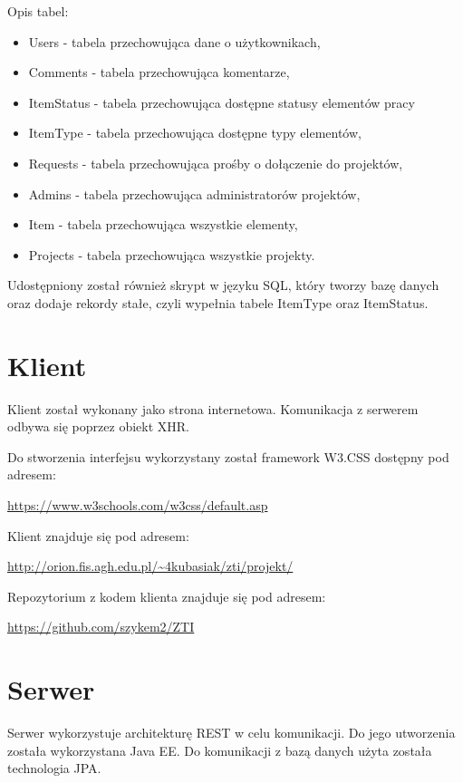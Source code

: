 \documentclass[11pt, titlepage]{article}
\begin{document}
Opis tabel:
\begin{itemize}
\item Users - tabela przechowująca dane o użytkownikach,
\item Comments - tabela przechowująca komentarze,
\item ItemStatus - tabela przechowująca dostępne statusy elementów pracy
\item ItemType - tabela przechowująca dostępne typy elementów,
\item Requests - tabela przechowująca prośby o dołączenie do projektów,
\item Admins - tabela przechowująca administratorów projektów,
\item Item - tabela przechowująca wszystkie elementy,
\item Projects - tabela przechowująca wszystkie projekty.
\end{itemize}

Udostępniony został również skrypt w języku SQL, który tworzy bazę danych oraz dodaje rekordy stałe, czyli wypełnia tabele ItemType oraz ItemStatus.

\section{Klient}
\hspace{11pt} Klient został wykonany jako strona internetowa. Komunikacja z serwerem odbywa się poprzez obiekt XHR.

Do stworzenia interfejsu wykorzystany został framework W3.CSS dostępny pod adresem:
\begin{center}
\url{https://www.w3schools.com/w3css/default.asp}
\end{center}

Klient znajduje się pod adresem:
\begin{center}
\url{http://orion.fis.agh.edu.pl/~4kubasiak/zti/projekt/}
\end{center}

Repozytorium z kodem klienta znajduje się pod adresem:
\begin{center}
\url{https://github.com/szykem2/ZTI}
\end{center}

\break

\section{Serwer}
\hspace{11pt} Serwer wykorzystuje architekturę REST w celu komunikacji. Do jego utworzenia została wykorzystana Java EE. Do komunikacji z bazą danych użyta została technologia JPA.
\end{document}
